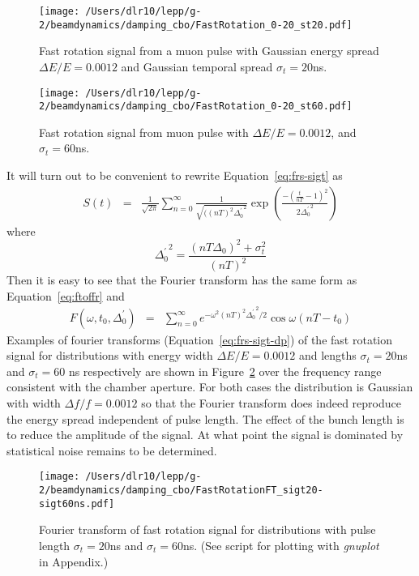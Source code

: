 \documentclass[10pt]{article}
\begin{document}
\begin{figure}[htbp] %
\begin{minipage}[t]{0.48\textwidth}
   \centering
   \texttt{[image: /Users/dlr10/lepp/g-2/beamdynamics/damping\_cbo/FastRotation\_0-20\_st20.pdf]} 
   \caption{Fast rotation signal from a muon pulse with Gaussian energy spread $\Delta E/E=0.0012$ and 
Gaussian temporal spread $\sigma_t = 20$ns. \label{fig:fastrotation_sigt20ns}}
 \end{minipage}
\hfill
\begin{minipage}[t]{0.48\textwidth}
\centering
   \texttt{[image: /Users/dlr10/lepp/g-2/beamdynamics/damping\_cbo/FastRotation\_0-20\_st60.pdf]} 
\caption{Fast rotation signal from muon pulse with $\Delta E/E = 0.0012$, and $\sigma_t = 60$ns.
   \label{fig:fastrotation_sigt60ns}}
\end{minipage}
\end{figure}

It will turn out to be convenient to rewrite Equation~\ref{eq:frs-sigt} as
\begin{eqnarray}
S(t)&=& \frac{1}{\sqrt{2\pi}}\sum_{n=0}^\infty
\frac{1}{\sqrt{((nT)^2{\Delta^\prime_0}^2}}
\exp(\frac{-(\frac{t}{nT}-1)^2}{2{\Delta^\prime_0}^2})\label{eq:frs-sigt-dp}
\end{eqnarray}
where $${\Delta^\prime_0}^2 = \frac{(nT\Delta_0)^2+\sigma_t^2}{(nT)^2}$$
Then it is easy to see that the Fourier transform has the same form as Equation~\ref{eq:ftoffr} and
\begin{eqnarray}
F(\omega,t_0,\Delta_0^\prime)&=& \sum_{n=0}^\infty e^{-\omega^2(nT)^2{\Delta_0^\prime}^2/2}\cos\omega(nT-t_0)\label{eq:ftoffr-sigt}
\end{eqnarray}
Examples of fourier transforms (Equation~\ref{eq:frs-sigt-dp}) of the fast rotation signal for distributions with energy width $\Delta E/E=0.0012$ and
lengths $\sigma_t=20$ns and $\sigma_t=60$ ns respectively are shown in Figure~\ref{fig:ft-sigt20-60}
over the frequency range consistent with the chamber aperture. For both cases the distribution is Gaussian with width $\Delta f/f = 0.0012$ so that the Fourier
transform does indeed reproduce the energy spread independent of pulse length. The effect of the bunch length is to reduce the amplitude of the signal. At what point the signal is dominated by statistical noise remains to be determined. 
\begin{figure}[htbp]
\centering
\texttt{[image: /Users/dlr10/lepp/g-2/beamdynamics/damping\_cbo/FastRotationFT\_sigt20-sigt60ns.pdf]}
\caption{Fourier transform of fast rotation signal for distributions with pulse length $\sigma_t=20$ns and $\sigma_t=60$ns. (See script for plotting with {\it gnuplot} in Appendix.)
\label{fig:ft-sigt20-60}}
\end{figure}
\end{document}
